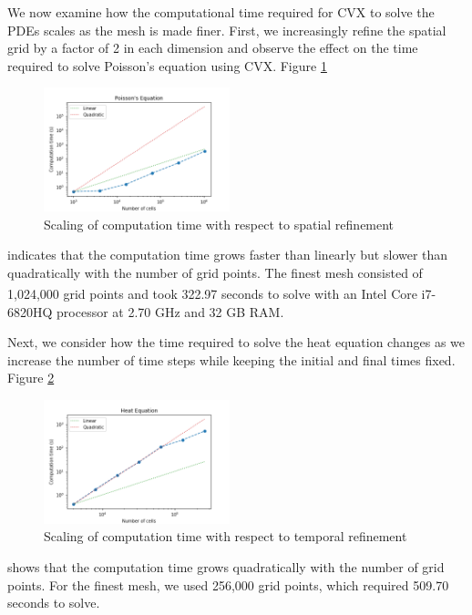 \documentclass[conference]{IEEEtran}
\begin{document}
We now examine how the computational time required for CVX to solve the PDEs scales as the mesh is made finer. First, we increasingly refine the spatial grid by a factor of 2 in each dimension and observe the effect on the time required to solve Poisson's equation using CVX. Figure \ref{fig:poisson-scale} 
\begin{figure}[h]
  \begin{center}
    \includegraphics[width=0.48\textwidth]{poisson-scale}
    \caption{Scaling of computation time with respect to spatial refinement}
    \label{fig:poisson-scale}
  \end{center}
\end{figure}
indicates that the computation time grows faster than linearly but slower than quadratically with the number of grid points. The finest mesh consisted of 1,024,000 grid points and took 322.97 seconds to solve with an Intel\textsuperscript{\textregistered} Core\texttrademark{} i7-6820HQ processor at 2.70 GHz and 32 GB RAM.

Next, we consider how the time required to solve the heat equation changes as we increase the number of time steps while keeping the initial and final times fixed. Figure \ref{fig:heat-scale}
\begin{figure}[h]
  \begin{center}
    \includegraphics[width=0.48\textwidth]{heat-scale}
    \caption{Scaling of computation time with respect to temporal refinement}
    \label{fig:heat-scale}
  \end{center}
\end{figure}
shows that the computation time grows quadratically with the number of grid points. For the finest mesh, we used 256,000 grid points, which required 509.70 seconds to solve.
\end{document}
